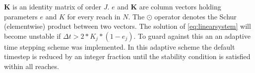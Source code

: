 $\mathbf{K}$ is an identity matrix of order $J$. $e$ and $\mathbf{K}$ are column vectors holding parameters $e$ and $K$ for every reach in $N$. The $\odot$ operator denotes the Schur (elementwise) product between two vectors. The solution of \eqref{eq:linearsystem} will become unstable if $\Delta t > 2 * K_j * (1 - e_j)$. To guard against this an an adaptive time stepping scheme was implemented. In this adaptive scheme the default timestep is reduced by an integer fraction until the stability condition is satisfied within all reaches.



